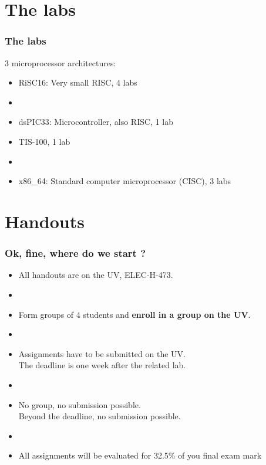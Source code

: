 \documentclass[11pt,a4paper,compress]{beamer}%
\begin{document}
\section{The labs}
\begin{frame}
\frametitle{The labs}

3 microprocessor architectures:
\begin{itemize}
\item RiSC16: Very small RISC, 4 labs
\item[]
\item dsPIC33: Microcontroller, also RISC, 1 lab
\item TIS-100, 1 lab
\item[]
\item x86\_64: Standard computer microprocessor (CISC), 3 labs
\end{itemize}
\end{frame}

\section{Handouts}
\begin{frame}
\frametitle{Ok, fine, where do we start ?}
\begin{itemize}
\item All handouts are on the UV, ELEC-H-473.
\item[]
\item Form groups of 4 students and \textbf{enroll in a group on the UV}.
\item[]
\item Assignments have to be submitted on the UV.\\ The deadline is one week after the related lab.
\item[]
\item No group, no submission possible.\\Beyond the deadline, no submission possible.
\item[]
\item All assignments will be evaluated for 32.5\% of you final exam mark
\end{itemize}



\end{frame}
\end{document}
